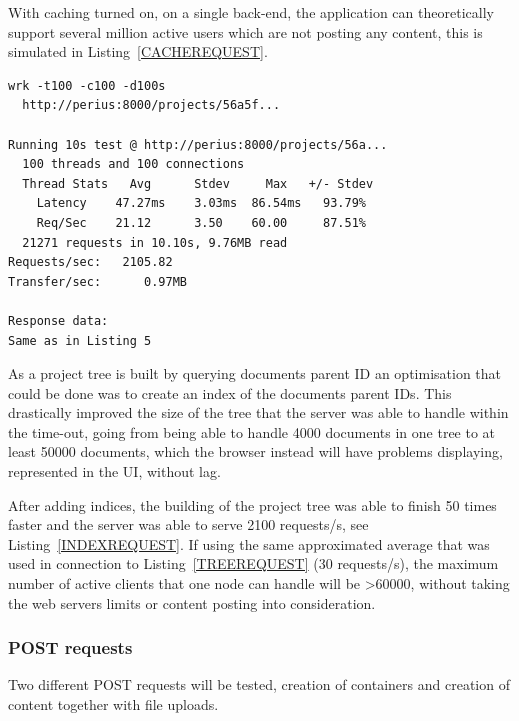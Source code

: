 \documentclass[a4paper,12pt]{article}
\begin{document}
\par
With caching turned on, on a single back-end, the application can theoretically support several 
million active users which are not posting any content, this is simulated in 
Listing~\ref{CACHEREQUEST}.

\begin{minipage}{\linewidth-1cm}
\begin{lstlisting}[label=INDEXREQUEST,caption=Result of indexed project tree requests]
wrk -t100 -c100 -d100s 
  http://perius:8000/projects/56a5f...
 
Running 10s test @ http://perius:8000/projects/56a...
  100 threads and 100 connections
  Thread Stats   Avg      Stdev     Max   +/- Stdev
    Latency    47.27ms    3.03ms  86.54ms   93.79%
    Req/Sec    21.12      3.50    60.00     87.51%
  21271 requests in 10.10s, 9.76MB read
Requests/sec:   2105.82
Transfer/sec:      0.97MB

Response data:
Same as in Listing 5
\end{lstlisting}
\end{minipage}

\par As a project tree is built by querying documents parent ID an optimisation that could be done was
to create an index of the documents parent IDs. This drastically improved the size of the tree that
the server was able to handle within the time-out, going from being able to handle 4000 documents in 
one tree to at least 50000 documents, which the browser instead will have problems displaying, 
represented in the UI, without lag.

\par After adding indices, the building of the project tree was able to finish 50 times faster and
the server was able to serve 2100 requests/s, see Listing~\ref{INDEXREQUEST}. If using the same
approximated average that was used in connection to Listing~\ref{TREEREQUEST} (30 requests/s), the
maximum number of active clients that one node can handle will be >60000, without taking the web
servers limits or content posting into consideration.

\subsubsection{POST requests}
Two different POST requests will be tested, creation of containers and creation of content together
with file uploads. 
\end{document}
